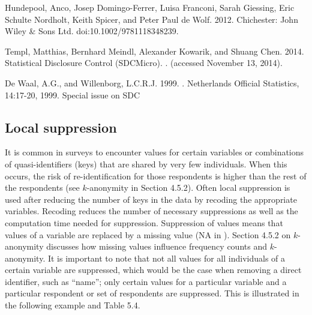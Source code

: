 \documentclass[letterpaper,10pt,english]{sphinxmanual}
\begin{document}
Hundepool, Anco, Josep Domingo-Ferrer, Luisa Franconi, Sarah Giessing,
Eric Schulte Nordholt, Keith Spicer, and Peter Paul de Wolf. 2012.
 Chichester: John Wiley \& Sons Ltd.
doi:10.1002/9781118348239.

Templ, Matthias, Bernhard Meindl, Alexander Kowarik, and Shuang Chen.
2014. Statistical Disclosure Control (SDCMicro).
. (accessed
November 13, 2014).

De Waal, A.G., and Willenborg, L.C.R.J. 1999. . Netherlands Official Statistics,
14:17-20, 1999. Special issue on SDC


\subsection{Local suppression}
\label{\detokenize{anon_methods:local-suppression}}
It is common in surveys to encounter values for certain variables or
combinations of quasi-identifiers (keys) that are shared by very few
individuals. When this occurs, the risk of re-identification for those
respondents is higher than the rest of the respondents (see
\(k\)-anonymity in Section 4.5.2). Often local suppression is used
after reducing the number of keys in the data by recoding the
appropriate variables. Recoding reduces the number of necessary
suppressions as well as the computation time needed for suppression.
Suppression of values means that values of a variable are replaced by a
missing value (NA in ). Section 4.5.2 on \(k\)-anonymity
discusses how missing values influence frequency counts and
\(k\)-anonymity. It is important to note that not all values for all
individuals of a certain variable are suppressed, which would be the
case when removing a direct identifier, such as “name”; only certain
values for a particular variable and a particular respondent or set of
respondents are suppressed. This is illustrated in the following example
and Table 5.4.
\end{document}
